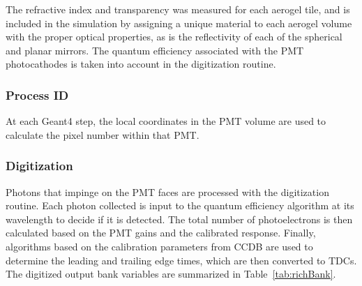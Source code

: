 The refractive index and transparency was measured for each aerogel tile, and is included in the simulation by
assigning a unique material to each aerogel volume with the proper optical properties, as is the reflectivity of each of
the spherical and planar mirrors. The quantum efficiency associated with the PMT photocathodes is taken into account
in the digitization routine.

\subsubsection{Process ID}

At each Geant4 step, the local coordinates in the PMT volume are used to calculate the pixel number within that PMT.

\subsubsection{Digitization}

Photons that impinge on the PMT faces are processed with the digitization routine. Each photon collected is input to the
quantum efficiency algorithm at its wavelength to decide if it is detected. The total number of photoelectrons is then
calculated based on the PMT gains and the calibrated response. Finally, algorithms based on the calibration parameters
from CCDB are used to determine the leading and trailing edge times, which are then converted to TDCs. The digitized
output bank variables are summarized in Table~\ref{tab:richBank}.

